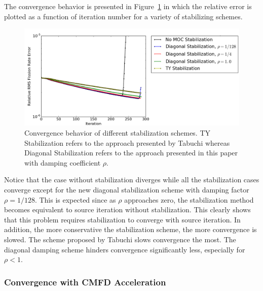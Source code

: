 The convergence behavior is presented in Figure~\ref{fig:no-cmfd} in which the relative error is plotted as a function of iteration number for a variety of stabilizing schemes.
\begin{figure}[ht!]
	\centering
	\includegraphics[width=1.0\linewidth]{figures/convergence/no_cmfd.png}
	\caption{Convergence behavior of different stabilization schemes. TY Stabilization refers to the approach presented by Tabuchi whereas Diagonal Stabilization refers to the approach presented in this paper with damping coefficient $\rho$.}
	\label{fig:no-cmfd}
\end{figure}
Notice that the case without stabilization diverges while all the stabilization cases converge except for the new diagonal stabilization scheme with damping factor $\rho = 1/128$. This is expected since as $\rho$ approaches zero, the stabilization method becomes equivalent to source iteration without stabilization. This clearly shows that this problem requires stabilization to converge with source iteration. In addition, the more conservative the stabilization scheme, the more convergence is slowed. The scheme proposed by Tabuchi slows convergence the most. The diagonal damping scheme hinders convergence significantly less, especially for $\rho < 1$.

\subsubsection{Convergence with CMFD Acceleration}

